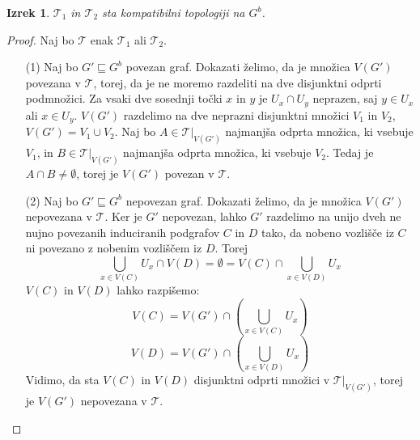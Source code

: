 \documentclass[a4paper, 12pt]{book}
\newtheorem{theorem}{Izrek}[section]
\theoremstyle{definition}
\theoremstyle{remark}
\begin{document}
\begin{theorem}
  $\mathcal{T}_1$ in $\mathcal{T}_2$ sta kompatibilni topologiji na $G^b$.
\end{theorem}
\begin{proof}
  Naj bo $\mathcal{T}$ enak $\mathcal{T}_1$ ali $\mathcal{T}_2$.
  \begin{itemize}
    \item[(1)] Naj bo $G' \sqsubseteq G^b$ povezan graf. Dokazati želimo, da je
    množica $V(G')$ povezana v $\mathcal{T}$, torej, da je ne moremo razdeliti na dve
    disjunktni odprti podmnožici. Za vsaki dve sosednji točki $x$ in $y$ je
    $U_x \cap U_y$ neprazen, saj $y \in U_x$ ali $x \in U_y$. $V(G')$
    razdelimo na dve neprazni disjunktni množici $V_1$ in $V_2$,
    $V(G') = V_1 \cup V_2$. Naj bo $A \in \mathcal{T}|_{V(G')}$
    najmanjša odprta množica, ki vsebuje $V_1$, in $B \in \mathcal{T}|_{V(G')}$
    najmanjša odprta množica, ki vsebuje $V_2$. Tedaj je $A \cap B \neq \emptyset$,
    torej je $V(G')$ povezan v $\mathcal{T}$.
    \item[(2)] Naj bo $G' \sqsubseteq G^b$ nepovezan graf. Dokazati želimo, da
    je množica $V(G')$ nepovezana v $\mathcal{T}$. Ker je $G'$ nepovezan, lahko $G'$ razdelimo
    na unijo dveh ne nujno povezanih induciranih podgrafov $C$ in $D$ tako, da nobeno vozlišče iz $C$
    ni povezano z nobenim vozliščem iz $D$. Torej
    \[\bigcup_{x\in V(C)}U_x \cap V(D) = \emptyset = V(C) \cap \bigcup_{x\in V(D)}U_x\]
    $V(C)$ in $V(D)$ lahko razpišemo:
    \[V(C) = V(G') \cap \left(\bigcup_{x\in V(C)} U_x\right)\]
    \[V(D) = V(G') \cap \left(\bigcup_{x\in V(D)} U_x\right)\]
    Vidimo, da sta $V(C)$ in $V(D)$ disjunktni odprti množici v $\mathcal{T}|_{V(G')}$,
    torej je $V(G')$ nepovezana v $\mathcal{T}$.
  \end{itemize}
\end{proof}
\end{document}
